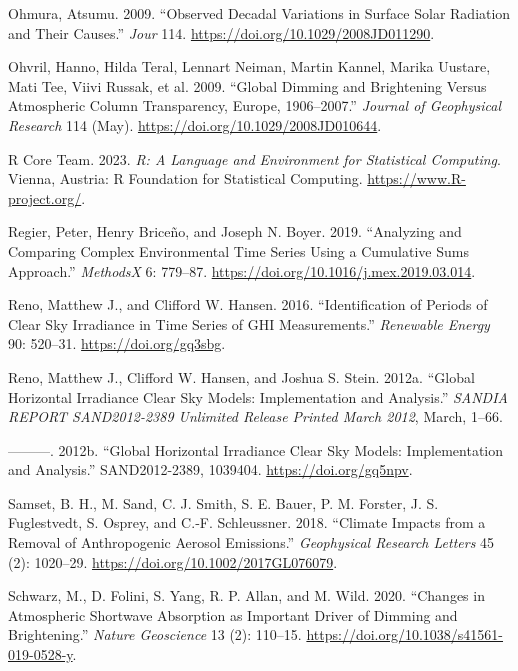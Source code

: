 \documentclass[
  preprint, 3p, authoryear]{article}
\newlength{\cslhangindent}
\newlength{\cslentryspacingunit} %
\newenvironment{CSLReferences}[2] %
 {%
  \setlength{\parindent}{0pt}
  \ifodd #1
  \let\oldpar\par
  \def\par{\hangindent=\cslhangindent\oldpar}
  \fi
  \setlength{\parskip}{#2\cslentryspacingunit}
 }%
 {}
\begin{document}
\begin{CSLReferences}{1}{0}
\leavevmode{}%
Ohmura, Atsumu. 2009. {``Observed Decadal Variations in Surface Solar Radiation and Their Causes.''} \emph{Jour} 114. \url{https://doi.org/10.1029/2008JD011290}.

\leavevmode{}%
Ohvril, Hanno, Hilda Teral, Lennart Neiman, Martin Kannel, Marika Uustare, Mati Tee, Viivi Russak, et al. 2009. {``Global Dimming and Brightening Versus Atmospheric Column Transparency, Europe, 1906--2007.''} \emph{Journal of Geophysical Research} 114 (May). \url{https://doi.org/10.1029/2008JD010644}.

\leavevmode{}%
R Core Team. 2023. \emph{R: A Language and Environment for Statistical Computing}. Vienna, Austria: R Foundation for Statistical Computing. \url{https://www.R-project.org/}.

\leavevmode{}%
Regier, Peter, Henry Briceño, and Joseph N. Boyer. 2019. {``Analyzing and Comparing Complex Environmental Time Series Using a Cumulative Sums Approach.''} \emph{{MethodsX}} 6: 779--87. \url{https://doi.org/10.1016/j.mex.2019.03.014}.

\leavevmode{}%
Reno, Matthew J., and Clifford W. Hansen. 2016. {``Identification of Periods of Clear Sky Irradiance in Time Series of GHI Measurements.''} \emph{Renewable Energy} 90: 520--31. \url{https://doi.org/gq3sbg}.

\leavevmode{}%
Reno, Matthew J., Clifford W. Hansen, and Joshua S. Stein. 2012a. {``{Global Horizontal Irradiance Clear Sky Models: Implementation and Analysis}.''} \emph{SANDIA REPORT SAND2012-2389 Unlimited Release Printed March 2012}, March, 1--66.

\leavevmode{}%
---------. 2012b. {``Global Horizontal Irradiance Clear Sky Models: Implementation and Analysis.''} SAND2012-2389, 1039404. \url{https://doi.org/gq5npv}.

\leavevmode{}%
Samset, B. H., M. Sand, C. J. Smith, S. E. Bauer, P. M. Forster, J. S. Fuglestvedt, S. Osprey, and C.‐F. Schleussner. 2018. {``Climate Impacts from a Removal of Anthropogenic Aerosol Emissions.''} \emph{Geophysical Research Letters} 45 (2): 1020--29. \url{https://doi.org/10.1002/2017GL076079}.

\leavevmode{}%
Schwarz, M., D. Folini, S. Yang, R. P. Allan, and M. Wild. 2020. {``Changes in Atmospheric Shortwave Absorption as Important Driver of Dimming and Brightening.''} \emph{Nature Geoscience} 13 (2): 110--15. \url{https://doi.org/10.1038/s41561-019-0528-y}.


\end{CSLReferences}
\end{document}
